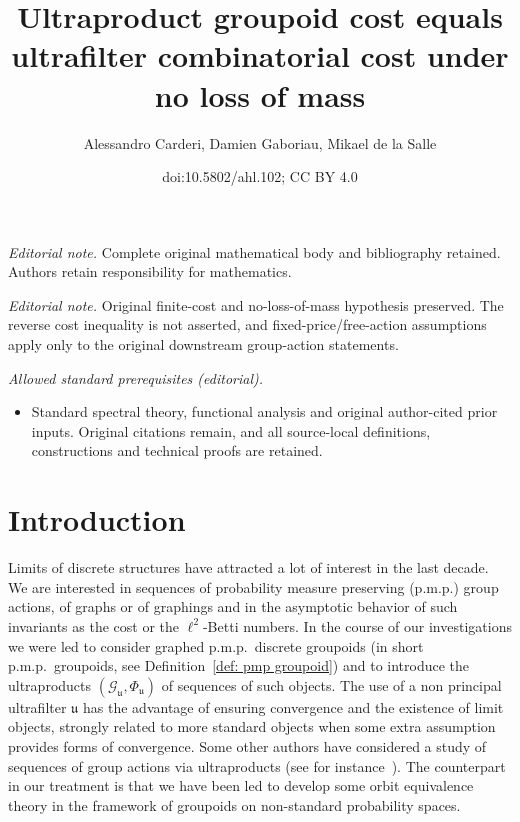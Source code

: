 \documentclass[10pt]{amsart}
\title{Ultraproduct groupoid cost equals ultrafilter combinatorial cost under no loss of mass}
\author{Alessandro Carderi, Damien Gaboriau, Mikael de la Salle}
\date{doi:10.5802/ahl.102; CC BY 4.0}
\theoremstyle{definition}
\newcommand{\cg}{\mathcal{G}}
\newcommand{\ul}{\mathfrak{u}}
\newcommand{\pmp}{p.m.p.\ }
\begin{document}
\maketitle
\noindent\textit{Editorial note.} Complete original mathematical body and bibliography retained. Authors retain responsibility for mathematics.\par\medskip
\noindent\textit{Editorial note.} Original finite-cost and no-loss-of-mass hypothesis preserved. The reverse cost inequality is not asserted, and fixed-price/free-action assumptions apply only to the original downstream group-action statements.\par\medskip
\noindent\textit{Allowed standard prerequisites (editorial).}\begin{itemize}
\item Standard spectral theory, functional analysis and original author-cited prior inputs. Original citations remain, and all source-local definitions, constructions and technical proofs are retained.
\end{itemize}\medskip
\section{Introduction}


Limits of discrete structures have attracted a lot of interest in the last decade. We are interested in sequences of probability measure preserving (p.m.p.) group actions, of graphs or of graphings and in the asymptotic behavior of such invariants as the cost or the $\ell^2$-Betti numbers. In the course of our investigations we were led to consider graphed \pmp discrete groupoids (in short \pmp groupoids, see Definition~\ref{def: pmp groupoid}) and to introduce the ultraproducts $(\cg_\ul, \Phi_\ul)$ of sequences of such objects. The use of a non principal ultrafilter $\ul$ has the advantage of ensuring convergence and the existence of limit objects, strongly related to more standard objects when some extra assumption provides forms of convergence. Some other authors have considered a study of sequences of group actions via ultraproducts (see for instance~\cite{Alekseev-Finn-Sell-sofic-boundaries-2016,Aaserud-Popa,Card-ultra-prod-we-sofic-arxiv,CKTD,Elek-2010-param-test}). The counterpart in our treatment is that we have been led to develop some orbit equivalence theory in the framework of groupoids on non-standard probability spaces.



\end{document}
